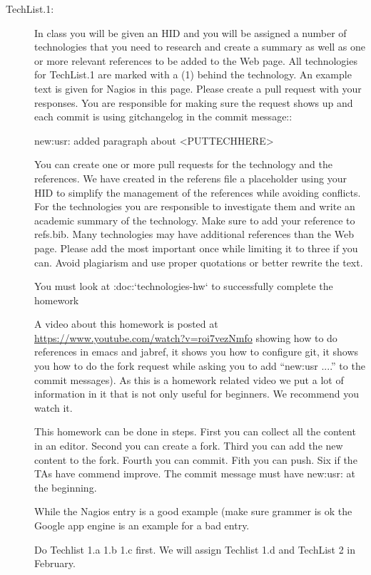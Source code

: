 \begin{description}

\item[TechList.1:] In class you will be given an HID and you will be assigned
  a number of technologies that you need to research and create a
  summary as well as one or more relevant references to be added to the
  Web page. All technologies for TechList.1 are marked with a (1)
  behind the technology.  An example text is given for Nagios in this
  page.  Please create a pull request with your responses. You are
  responsible for making sure the request shows up and each commit is
  using gitchangelog in the commit message::

    new:usr: added paragraph about <PUTTECHHERE>

  You can create one or more pull requests for the technology and the
  references. We have created in the referens file a placeholder using
  your HID to simplify the management of the references while avoiding
  conflicts.  For the technologies you are responsible to investigate
  them and write an academic summary of the technology. Make sure to
  add your reference to refs.bib.  Many technologies may have
  additional references than the Web page. Please add the most
  important once while limiting it to three if you can. Avoid
  plagiarism and use proper quotations or better rewrite the text.

  You must look at :doc:`technologies-hw` to successfully complete the
  homework

  A video about this homework is posted at
  \url{https://www.youtube.com/watch?v=roi7vezNmfo} showing how to
  do references in emacs and jabref, it shows you how to configure
  git, it shows you how to do the fork request while asking you to add
  ``new:usr ....'' to the commit messages). As this is a homework
  related video we put a lot of information in it that is not only
  useful for beginners. We recommend you watch it.


  This homework can be done in steps. First you can collect all the
  content in an editor. Second you can create a fork. Third you can
  add the new content to the fork. Fourth you can commit. Fith you
  can push. Six if the TAs have commend improve. The commit message
  must have new:usr: at the beginning.

  While the Nagios entry is a good example (make sure grammer is ok
  the Google app engine is an example for a bad entry.

  Do Techlist 1.a 1.b 1.c first. We  will assign Techlist 1.d and
  TechList 2 in February.


\end{description}
